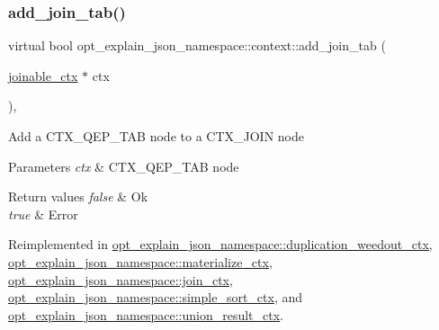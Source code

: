 \subsubsection{\texorpdfstring{add\+\_\+join\+\_\+tab()}{add\_join\_tab()}}
{\footnotesize\ttfamily virtual bool opt\+\_\+explain\+\_\+json\+\_\+namespace\+::context\+::add\+\_\+join\+\_\+tab (\begin{DoxyParamCaption}\item[{\mbox{\hyperlink{classopt__explain__json__namespace_1_1joinable__ctx}{joinable\+\_\+ctx}} $\ast$}]{ctx }\end{DoxyParamCaption})\hspace{0.3cm}{\ttfamily [inline]}, {\ttfamily [virtual]}}

Add a C\+T\+X\+\_\+\+Q\+E\+P\+\_\+\+T\+AB node to a C\+T\+X\+\_\+\+J\+O\+IN node


\begin{DoxyParams}{Parameters}
{\em ctx} & C\+T\+X\+\_\+\+Q\+E\+P\+\_\+\+T\+AB node\\
\hline
\end{DoxyParams}

\begin{DoxyRetVals}{Return values}
{\em false} & Ok \\
\hline
{\em true} & Error \\
\hline
\end{DoxyRetVals}


Reimplemented in \mbox{\hyperlink{classopt__explain__json__namespace_1_1duplication__weedout__ctx_a6b1d2505d9f83d8c4fcf56d7b58ebca0}{opt\+\_\+explain\+\_\+json\+\_\+namespace\+::duplication\+\_\+weedout\+\_\+ctx}}, \mbox{\hyperlink{classopt__explain__json__namespace_1_1materialize__ctx_ac078469c04990cd7639ab09c585809d9}{opt\+\_\+explain\+\_\+json\+\_\+namespace\+::materialize\+\_\+ctx}}, \mbox{\hyperlink{classopt__explain__json__namespace_1_1join__ctx_a2eec52e554d339b5f45630e7f8cf5d41}{opt\+\_\+explain\+\_\+json\+\_\+namespace\+::join\+\_\+ctx}}, \mbox{\hyperlink{classopt__explain__json__namespace_1_1simple__sort__ctx_abfe9f7f76b32e211f5c70f3023aaba63}{opt\+\_\+explain\+\_\+json\+\_\+namespace\+::simple\+\_\+sort\+\_\+ctx}}, and \mbox{\hyperlink{classopt__explain__json__namespace_1_1union__result__ctx_a3c7d8284cb5c779f33f344a986f6a4f6}{opt\+\_\+explain\+\_\+json\+\_\+namespace\+::union\+\_\+result\+\_\+ctx}}.

\mbox{\label{classopt__explain__json__namespace_1_1context_a78bdde3b4bea092ee885bfb0647f08cb}} 
